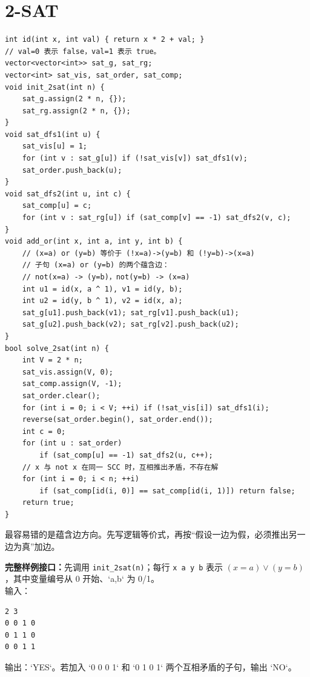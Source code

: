 \section{2-SAT}


\begin{lstlisting}[style=cpp]
int id(int x, int val) { return x * 2 + val; }
// val=0 表示 false，val=1 表示 true。
vector<vector<int>> sat_g, sat_rg;
vector<int> sat_vis, sat_order, sat_comp;
void init_2sat(int n) {
    sat_g.assign(2 * n, {});
    sat_rg.assign(2 * n, {});
}
void sat_dfs1(int u) {
    sat_vis[u] = 1;
    for (int v : sat_g[u]) if (!sat_vis[v]) sat_dfs1(v);
    sat_order.push_back(u);
}
void sat_dfs2(int u, int c) {
    sat_comp[u] = c;
    for (int v : sat_rg[u]) if (sat_comp[v] == -1) sat_dfs2(v, c);
}
void add_or(int x, int a, int y, int b) {
    // (x=a) or (y=b) 等价于 (!x=a)->(y=b) 和 (!y=b)->(x=a)
    // 子句 (x=a) or (y=b) 的两个蕴含边：
    // not(x=a) -> (y=b)，not(y=b) -> (x=a)
    int u1 = id(x, a ^ 1), v1 = id(y, b);
    int u2 = id(y, b ^ 1), v2 = id(x, a);
    sat_g[u1].push_back(v1); sat_rg[v1].push_back(u1);
    sat_g[u2].push_back(v2); sat_rg[v2].push_back(u2);
}
bool solve_2sat(int n) {
    int V = 2 * n;
    sat_vis.assign(V, 0);
    sat_comp.assign(V, -1);
    sat_order.clear();
    for (int i = 0; i < V; ++i) if (!sat_vis[i]) sat_dfs1(i);
    reverse(sat_order.begin(), sat_order.end());
    int c = 0;
    for (int u : sat_order)
        if (sat_comp[u] == -1) sat_dfs2(u, c++);
    // x 与 not x 在同一 SCC 时，互相推出矛盾，不存在解
    for (int i = 0; i < n; ++i)
        if (sat_comp[id(i, 0)] == sat_comp[id(i, 1)]) return false;
    return true;
}
\end{lstlisting}

\begin{warnbox}
最容易错的是蕴含边方向。先写逻辑等价式，再按“假设一边为假，必须推出另一边为真”加边。
\end{warnbox}

\begin{card}
\textbf{完整样例接口：}先调用 \texttt{init\_2sat(n)}；每行 \texttt{x a y b} 表示
\((x=a)\lor(y=b)\)，其中变量编号从 0 开始、`a,b` 为 0/1。\\
输入：
\begin{lstlisting}
2 3
0 0 1 0
0 1 1 0
0 0 1 1
\end{lstlisting}
输出：`YES`。若加入 `0 0 0 1` 和 `0 1 0 1` 两个互相矛盾的子句，输出 `NO`。
\end{card}

